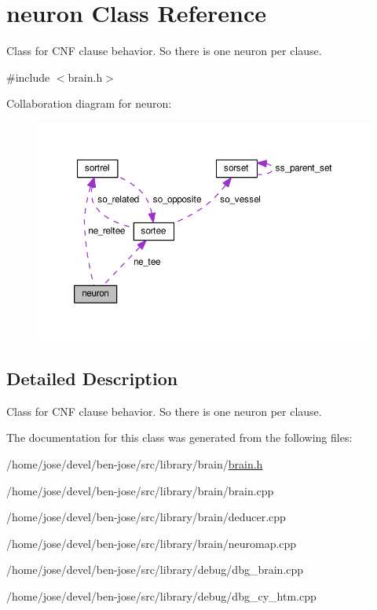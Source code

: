 \hypertarget{classneuron}{\section{neuron Class Reference}
\label{classneuron}
}


Class for C\+N\+F clause behavior. So there is one neuron per clause.  




{\ttfamily \#include $<$brain.\+h$>$}



Collaboration diagram for neuron\+:\nopagebreak
\begin{figure}[H]
\begin{center}
\leavevmode
\includegraphics[width=350pt]{dc/dba/classneuron__coll__graph}
\end{center}
\end{figure}


\subsection{Detailed Description}
Class for C\+N\+F clause behavior. So there is one neuron per clause. 

The documentation for this class was generated from the following files\+:\begin{DoxyCompactItemize}
\item 
/home/jose/devel/ben-\/jose/src/library/brain/\hyperlink{brain_8h}{brain.\+h}\item 
/home/jose/devel/ben-\/jose/src/library/brain/brain.\+cpp\item 
/home/jose/devel/ben-\/jose/src/library/brain/deducer.\+cpp\item 
/home/jose/devel/ben-\/jose/src/library/brain/neuromap.\+cpp\item 
/home/jose/devel/ben-\/jose/src/library/debug/dbg\+\_\+brain.\+cpp\item 
/home/jose/devel/ben-\/jose/src/library/debug/dbg\+\_\+cy\+\_\+htm.\+cpp\end{DoxyCompactItemize}
